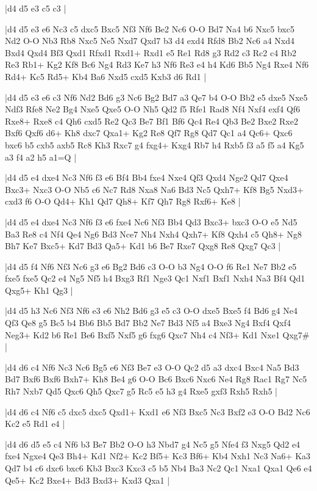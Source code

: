 \whitename{}
\blackname{}
\makegametitle
|d4 d5 e3 c5 c3  |

\whitename{}
\blackname{}
\makegametitle
|d4 d5 e3 e6 Nc3 c5 dxc5 Bxc5 Nf3 Nf6 Be2 Nc6 O-O Bd7 Na4 b6 Nxc5 bxc5 Nd2 O-O Nb3 Rb8 Nxc5 Ne5 Nxd7 Qxd7 b3 d4 exd4 Rfd8 Bb2 Nc6 a4 Nxd4 Bxd4 Qxd4 Bf3 Qxd1 Rfxd1 Rxd1+ Rxd1 e5 Re1 Rd8 g3 Rd2 c3 Rc2 c4 Rb2 Re3 Rb1+ Kg2 Kf8 Bc6 Ng4 Rd3 Ke7 h3 Nf6 Re3 e4 h4 Kd6 Bb5 Ng4 Rxe4 Nf6 Rd4+ Kc5 Rd5+ Kb4 Ba6 Nxd5 cxd5 Kxb3 d6 Rd1  |

\whitename{}
\blackname{}
\makegametitle
|d4 d5 e3 e6 c3 Nf6 Nd2 Bd6 g3 Nc6 Bg2 Bd7 a3 Qe7 b4 O-O Bb2 e5 dxe5 Nxe5 Ndf3 Rfe8 Ne2 Bg4 Nxe5 Qxe5 O-O Nh5 Qd2 f5 Rfe1 Rad8 Nf4 Nxf4 exf4 Qf6 Rxe8+ Rxe8 c4 Qh6 cxd5 Re2 Qc3 Be7 Bf1 Bf6 Qc4 Re4 Qb3 Be2 Bxe2 Rxe2 Bxf6 Qxf6 d6+ Kh8 dxc7 Qxa1+ Kg2 Re8 Qf7 Rg8 Qd7 Qc1 a4 Qc6+ Qxc6 bxc6 b5 cxb5 axb5 Rc8 Kh3 Rxc7 g4 fxg4+ Kxg4 Rb7 h4 Rxb5 f3 a5 f5 a4 Kg5 a3 f4 a2 h5 a1=Q  |

\whitename{}
\blackname{}
\makegametitle
|d4 d5 e4 dxe4 Nc3 Nf6 f3 e6 Bf4 Bb4 fxe4 Nxe4 Qf3 Qxd4 Nge2 Qd7 Qxe4 Bxc3+ Nxc3 O-O Nb5 c6 Nc7 Rd8 Nxa8 Na6 Bd3 Nc5 Qxh7+ Kf8 Bg5 Nxd3+ cxd3 f6 O-O Qd4+ Kh1 Qd7 Qh8+ Kf7 Qh7 Rg8 Rxf6+ Ke8  |

\whitename{}
\blackname{}
\makegametitle
|d4 d5 e4 dxe4 Nc3 Nf6 f3 e6 fxe4 Nc6 Nf3 Bb4 Qd3 Bxc3+ bxc3 O-O e5 Nd5 Ba3 Re8 c4 Nf4 Qe4 Ng6 Bd3 Nce7 Nh4 Nxh4 Qxh7+ Kf8 Qxh4 c5 Qh8+ Ng8 Bh7 Ke7 Bxc5+ Kd7 Bd3 Qa5+ Kd1 b6 Be7 Rxe7 Qxg8 Re8 Qxg7 Qc3  |

\whitename{}
\blackname{}
\makegametitle
|d4 d5 f4 Nf6 Nf3 Nc6 g3 e6 Bg2 Bd6 c3 O-O b3 Ng4 O-O f6 Re1 Ne7 Bb2 e5 fxe5 fxe5 Qc2 e4 Ng5 Nf5 h4 Bxg3 Rf1 Nge3 Qc1 Nxf1 Bxf1 Nxh4 Na3 Bf4 Qd1 Qxg5+ Kh1 Qg3  |

\whitename{}
\blackname{}
\makegametitle
|d4 d5 h3 Nc6 Nf3 Nf6 e3 e6 Nh2 Bd6 g3 e5 c3 O-O dxe5 Bxe5 f4 Bd6 g4 Ne4 Qf3 Qe8 g5 Bc5 b4 Bb6 Bb5 Bd7 Bb2 Ne7 Bd3 Nf5 a4 Bxe3 Ng4 Bxf4 Qxf4 Neg3+ Kd2 b6 Re1 Be6 Bxf5 Nxf5 g6 fxg6 Qxc7 Nh4 c4 Nf3+ Kd1 Nxe1 Qxg7\#  |

\whitename{}
\blackname{}
\makegametitle
|d4 d6 c4 Nf6 Nc3 Nc6 Bg5 e6 Nf3 Be7 e3 O-O Qc2 d5 a3 dxc4 Bxc4 Na5 Bd3 Bd7 Bxf6 Bxf6 Bxh7+ Kh8 Be4 g6 O-O Bc6 Bxc6 Nxc6 Ne4 Rg8 Rac1 Rg7 Nc5 Rh7 Nxb7 Qd5 Qxc6 Qh5 Qxc7 g5 Rc5 e5 h3 g4 Rxe5 gxf3 Rxh5 Rxh5  |

\whitename{}
\blackname{}
\makegametitle
|d4 d6 c4 Nf6 c5 dxc5 dxc5 Qxd1+ Kxd1 e6 Nf3 Bxc5 Nc3 Bxf2 e3 O-O Bd2 Nc6 Kc2 e5 Rd1 e4  |

\whitename{}
\blackname{}
\makegametitle
|d4 d6 d5 e5 c4 Nf6 b3 Be7 Bb2 O-O h3 Nbd7 g4 Nc5 g5 Nfe4 f3 Nxg5 Qd2 e4 fxe4 Ngxe4 Qe3 Bh4+ Kd1 Nf2+ Kc2 Bf5+ Kc3 Bf6+ Kb4 Nxh1 Nc3 Na6+ Ka3 Qd7 b4 c6 dxc6 bxc6 Kb3 Bxc3 Kxc3 c5 b5 Nb4 Ba3 Nc2 Qc1 Nxa1 Qxa1 Qe6 e4 Qe5+ Kc2 Bxe4+ Bd3 Bxd3+ Kxd3 Qxa1  |

